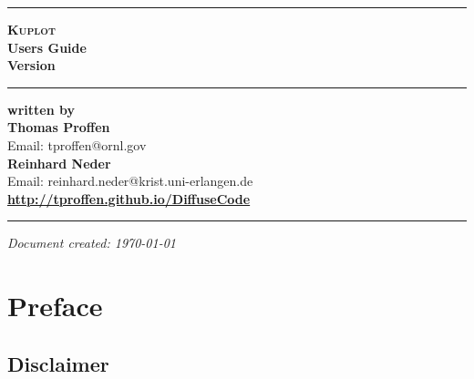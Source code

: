 \documentclass[11pt]{report}
\newcommand{\kuplot}{\textsc{Kuplot}}
\begin{document}

\begin{titlepage}
\begin{flushright}

  \hrule
  \vspace{15mm}
  \textbf{{ \kuplot}} \\
  \vspace{15mm}
  \textbf{{ Users Guide}} \\
  \vspace{10mm}
  \textbf{{\Huge Version  \version}} \\
  \vspace{10mm}

  \hrule
  \vspace{40mm}
  \textbf{written by} \\

  \vspace{5mm}
  \textbf{\Large Thomas Proffen} \\
  Email: tproffen@ornl.gov \\

  \vspace{ 2mm}
  \textbf{\Large Reinhard Neder} \\
  Email: reinhard.neder@krist.uni-erlangen.de \\

  \vspace{12mm}
  \textbf{\Large \url{http://tproffen.github.io/DiffuseCode}} \\

  \vspace{3mm}
  \hrule
  \vspace{2mm}
\end{flushright}
\begin{flushright}
  \textit{Document created: \today}
\end{flushright}

\end{titlepage}


\chapter*{Preface}
\section*{Disclaimer}
\end{document}
